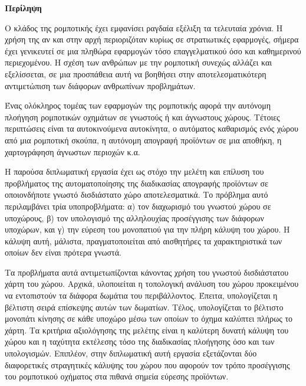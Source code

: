 \begin{center}
  \centering

  \vspace{0.5cm}
  \centering
  \textbf{\Large{Περίληψη}}

  \vspace{1cm}

\end{center}

Ο κλάδος της ρομποτικής έχει εμφανίσει ραγδαία εξέλιξη τα τελευταία χρόνια. Η χρήση της αν και στην αρχή περιοριζόταν κυρίως σε στρατιωτικές εφαρμογές, σήμερα έχει γενικευτεί σε μια πληθώρα εφαρμογών τόσο επαγγελματικού όσο και καθημερινού περιεχομένου. Η σχέση των ανθρώπων με την ρομποτική συνεχώς αλλάζει και εξελίσσεται, σε μια προσπάθεια αυτή να βοηθήσει στην αποτελεσματικότερη αντιμετώπιση των διάφορων ανθρωπίνων προβλημάτων. 

Ένας ολόκληρος τομέας των εφαρμογών της ρομποτικής αφορά την αυτόνομη πλοήγηση ρομποτικών οχημάτων σε γνωστούς ή και άγνωστους χώρους. Τέτοιες περιπτώσεις είναι τα αυτοκινούμενα αυτοκίνητα, ο αυτόματος καθαρισμός ενός χώρου από μια ρομποτική σκούπα, η αυτόνομη απογραφή προϊόντων σε μια αποθήκη, η χαρτογράφηση άγνωστων περιοχών κ.α.

Η παρούσα διπλωματική εργασία έχει ως στόχο την μελέτη και επίλυση του προβλήματος της αυτοματοποίησης της διαδικασίας απογραφής προϊόντων σε οποιονδήποτε γνωστό δισδιάστατο χώρο αποτελεσματικά. Το πρόβλημα αυτό περιλαμβάνει τρία υποπροβλήματα: α) τον διαχωρισμό του γνωστού χώρου σε υποχώρους, β) τον υπολογισμό της αλληλουχίας προσέγγισης των διάφορων υποχώρων, και γ) την εύρεση του μονοπατιού για την πλήρη κάλυψη του χώρου. Η κάλυψη αυτή, μάλιστα, πραγματοποιείται από αισθητήρες τα χαρακτηριστικά των οποίων δεν είναι πρότερα γνωστά.

Τα προβλήματα αυτά αντιμετωπίζονται κάνοντας χρήση του γνωστού δισδιάστατου χάρτη του χώρου. Αρχικά, υλοποιείται η τοπολογική ανάλυση του χώρου προκειμένου να εντοπιστούν τα διάφορα δωμάτια του περιβάλλοντος. Έπειτα, υπολογίζεται η βέλτιστη σειρά επίσκεψης αυτών των δωματίων. Τέλος, υπολογίζεται το βέλτιστο μονοπάτι κίνησης σε κάθε υποχώρο μέσω των οποίων το όχημα καλύπτει πλήρως το χάρτη. Τα κριτήρια αξιολόγησης της μελέτης είναι η καλύτερη δυνατή κάλυψη του χώρου και η ταχύτητα εκτέλεσης τόσο της διαδικασίας πλοήγησης όσο και των υπολογισμών. Επιπλέον, στην διπλωματική αυτή εργασία εξετάζονται δύο διαφορετικές στραγητικές κάλυψης του χώρου που αφορούν τον τρόπο προσέγγισης του ρομποτικού οχήματος στα πιθανά σημεία εύρεσης προϊόντων.

